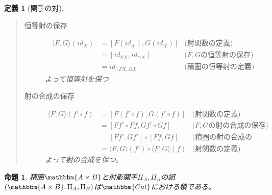 \documentclass[dvipdfmx]{jsarticle}
\newcommand{\cat}[1]{\mathbbm{#1}}
\newcommand{\tuple}[1]{\langle #1\rangle}
\newcommand{\pcobj}[1]{[#1]}
\newtheorem{prop}{命題}[section]
\newtheorem{define}{定義}[section]
\numberwithin{proof}{subsection}
\numberwithin{prop}{subsection}
\numberwithin{define}{subsection}
\begin{document}
\begin{define}[関手の対]
\begin{quote}
\begin{description}
				\begin{center}
				\end{center}
				\item[恒等射の保存]
				\begin{align*}
					\tuple{F,G}(id_X)&=\pcobj{F(id_X),G(id_X)}&\text{(射関数の定義)}\\
					&=\pcobj{id_{FX},id_{GX}}&\text{($F,G$の恒等射の保存)}\\
					&=id_{\pcobj{FX,GX}}&\text{(積圏の恒等射の定義)}
				\end{align*}
			よって恒等射を保つ
				\item[射の合成の保存]
				\begin{align*}
					\tuple{F,G}(f'\circ f)&=\pcobj{F(f'\circ f),G(f'\circ f)}&\text{(射関数の定義)}\\
					&=\pcobj{Ff'\circ Ff, Gf'\circ Gf}&\text{($F,G$の射の合成の保存)}\\
					&=\pcobj{Ff',Gf'}\circ\pcobj{Ff,Gf}&\text{(積圏の射の合成の定義)}\\
					&=\tuple{F,G}(f')\circ\tuple{F,G}(f)&\text{(射関数の定義)}
				\end{align*}
			よって射の合成を保つ。
			\end{description}
		\end{quote}
	\end{define}
	\begin{prop}
		積圏$\cat{A\times B}$と射影関手$\Pi_A,\Pi_B$の組$(\cat{A\times B},\Pi_A,\Pi_B)$は$\cat{Cat}$における積である。
	\end{prop}
\end{document}
